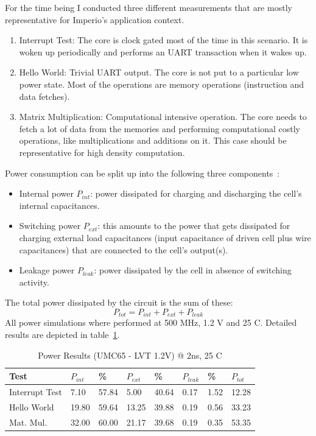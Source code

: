 For the time being I conducted three different measurements that are mostly representative for Imperio's application context.

\begin{enumerate}
    \item Interrupt Test: The core is clock gated most of the time in this scenario. It is woken up periodically and performs an UART transaction when it wakes up.
    \item Hello World: Trivial UART output. The core is not put to a particular low power state. Most of the operations are memory operations (instruction and data fetches).
    \item Matrix Multiplication: Computational intensive operation. The core needs to fetch a lot of data from the memories and performing computational costly operations, like multiplications and additions on it. This case should be representative for high density computation. 
\end{enumerate}

Power consumption can be split up into the following three components~\cite{Kaeslin08}:
\begin{itemize}
    \item Internal power $P_{int}$: power dissipated for charging and discharging the cell's internal capacitances.
    \item Switching power $P_{ext}$: this amounts to the power that gets dissipated for charging external load capacitances (input capacitance of driven cell plus wire capacitances) that are connected to the cell's output(s).
    \item Leakage power $P_{leak}$: power dissipated by the cell in absence of switching activity.
\end{itemize}
The total power dissipated by the circuit is the sum of these:
\[
    P_{tot} = P_{int} + P_{ext} + P_{leak}
\]
All power simulations where performed at 500 MHz, 1.2 V and 25 \textdegree C. Detailed results are depicted in table~\ref{tab:power}.

\begin{table}[htbp]
 \caption{Power Results (UMC65 - LVT 1.2V) @ 2ns, 25 \textdegree C}
 \label{tab:power}
\begin{tabularx}{\textwidth}{|X||l|l||l|l||l|l||l|}
  \hline
  \textbf{Test} & $P_{int}$& \% & $P_{ext}$ &  \% & $P_{leak}$ &  \% & $P_{tot}$\\ \hline
Interrupt Test & 7.10 & 57.84 & 5.00 &  40.64 & 0.17 & 1.52 & 12.28 \\ \hline
Hello World & 19.80 & 59.64 & 13.25 & 39.88 & 0.19 & 0.56 & 33.23 \\ \hline
Mat. Mul. & 32.00 & 60.00 & 21.17 & 39.68 & 0.19 & 0.35 & 53.35 \\ \hline
  \end{tabularx}
  \end{table}




